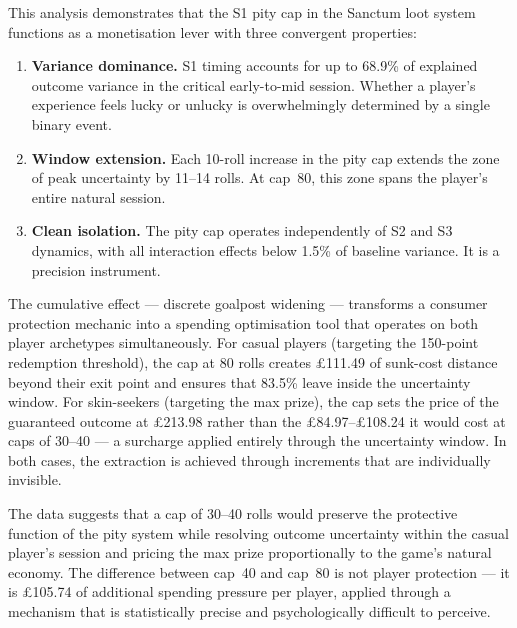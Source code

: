 \documentclass[11pt, a4paper]{article}
\begin{document}
This analysis demonstrates that the S1 pity cap in the Sanctum loot
system functions as a monetisation lever with three convergent
properties:

\begin{enumerate}[nosep]
    \item \textbf{Variance dominance.} S1 timing accounts for up to
          68.9\% of explained outcome variance in the critical
          early-to-mid session. Whether a player's experience feels
          lucky or unlucky is overwhelmingly determined by a single
          binary event.

    \item \textbf{Window extension.} Each 10-roll increase in the
          pity cap extends the zone of peak uncertainty by 11--14
          rolls. At cap~80, this zone spans the player's entire
          natural session.

    \item \textbf{Clean isolation.} The pity cap operates independently
          of S2 and S3 dynamics, with all interaction effects below
          1.5\% of baseline variance. It is a precision instrument.
\end{enumerate}

The cumulative effect --- discrete goalpost widening --- transforms a
consumer protection mechanic into a spending optimisation tool that
operates on both player archetypes simultaneously. For casual players
(targeting the 150-point redemption threshold), the cap at 80 rolls
creates \pounds111.49 of sunk-cost distance beyond their exit point and
ensures that 83.5\% leave inside the uncertainty window. For
skin-seekers (targeting the max prize), the cap sets the price of
the guaranteed outcome at \pounds213.98 rather than the \pounds84.97--\pounds108.24
it would cost at caps of 30--40 --- a surcharge applied entirely
through the uncertainty window. In both cases, the extraction is
achieved through increments that are individually invisible.

The data suggests that a cap of 30--40 rolls would preserve the
protective function of the pity system while resolving outcome
uncertainty within the casual player's session and pricing the max
prize proportionally to the game's natural economy. The difference
between cap~40 and cap~80 is not player protection --- it is
\pounds105.74 of additional spending pressure per player, applied
through a mechanism that is statistically precise and psychologically
difficult to perceive.
\end{document}
